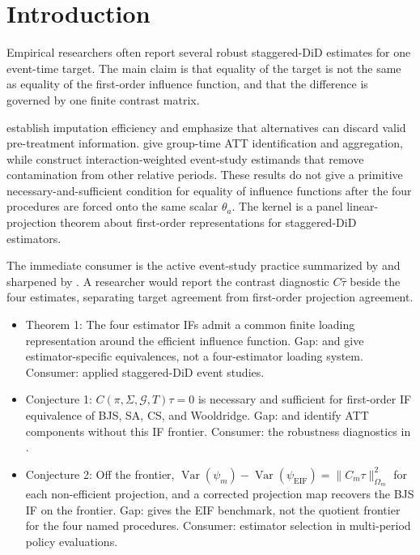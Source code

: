 \documentclass[11pt]{article}
\theoremstyle{definition}
\theoremstyle{plain}
\theoremstyle{remark}
\begin{document}
\section{Introduction}
Empirical researchers often report several robust staggered-DiD estimates for
one event-time target.  The main claim is that equality of the target is not
the same as equality of the first-order influence function, and that the
difference is governed by one finite contrast matrix.

\citet[Theorem 1 and Section 4.3]{borusyak_jaravel_spiess_2024_restud}
establish imputation efficiency and emphasize that alternatives can discard
valid pre-treatment information.  \citet[Theorem 1 and Section
3.1]{callaway_santanna_2021_joe} give group-time ATT identification and
aggregation, while \citet[Theorem 1 and Section 3]{sun_abraham_2021_joe}
construct interaction-weighted event-study estimands that remove contamination
from other relative periods.  These results do not give a primitive
necessary-and-sufficient condition for equality of influence functions after
the four procedures are forced onto the same scalar $\theta_a$.  The kernel is
a panel linear-projection theorem about first-order representations for
staggered-DiD estimators.

The immediate consumer is the active event-study practice summarized by
\citet{roth_santanna_bilinski_poe_2023_joe} and sharpened by
\citet{roth_2026_eventstudy_note}.  A researcher would report the contrast
diagnostic $C\widehat\tau$ beside the four estimates, separating target
agreement from first-order projection agreement.

\begin{itemize}[leftmargin=*]
\item Theorem 1: The four estimator IFs admit a common finite loading
representation around the efficient influence function. Gap:
\citet{borusyak_jaravel_spiess_2024_restud} and
\citet{wooldridge_2023_ectj} give estimator-specific equivalences, not a
four-estimator loading system. Consumer: applied staggered-DiD event studies.
\item Conjecture 1: $C(\pi,\Sigma,\mathcal G,T)\tau=0$ is necessary and
sufficient for first-order IF equivalence of BJS, SA, CS, and Wooldridge.
Gap: \citet{callaway_santanna_2021_joe} and
\citet{sun_abraham_2021_joe} identify ATT components without this IF frontier.
Consumer: the robustness diagnostics in
\citet{roth_santanna_bilinski_poe_2023_joe}.
\item Conjecture 2: Off the frontier,
$\operatorname{Var}(\psi_m)-\operatorname{Var}(\psi_{\mathrm{EIF}})
=\|C_m\tau\|_{\Omega_m}^{2}$ for each non-efficient projection, and a
corrected projection map recovers the BJS IF on the frontier. Gap:
\citet[Section 3 and the efficient-variance display following the EIF
formula]{chen_santanna_xie_2025} gives the EIF benchmark, not the quotient
frontier for the four named procedures. Consumer: estimator selection in
multi-period policy evaluations.
\end{itemize}
\end{document}
